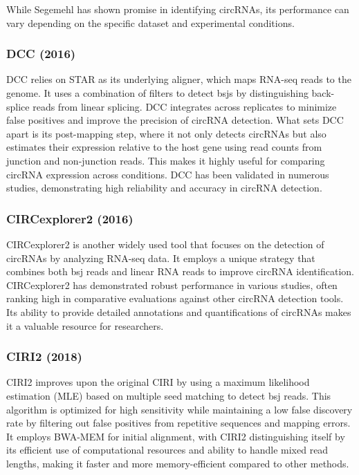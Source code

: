 While Segemehl has shown promise in identifying circRNAs, its performance can
vary depending on the specific dataset and experimental
conditions\supercite{gao_ciri_2015,zeng_comprehensive_2017}.

\subsubsection{DCC (2016)\supercite{cheng_specific_2016}}
DCC relies on STAR as its underlying aligner, which maps RNA-seq reads to the
genome.
It uses a combination of filters to detect \gls{bsj}s by distinguishing
back-splice reads from linear splicing.
DCC integrates across replicates to minimize false positives and improve the
precision of circRNA detection.
What sets DCC apart is its post-mapping step, where it not only detects
circRNAs but also estimates their expression relative to the host gene using
read counts from junction and non-junction reads.
This makes it highly useful for comparing circRNA expression across
conditions\supercite{cheng_specific_2016}.
DCC has been validated in numerous studies, demonstrating high reliability and
accuracy in circRNA detection\supercite{paraboschi_interpreting_2018}.

\subsubsection{CIRCexplorer2 (2016)\supercite{zhang_diverse_2016}}
CIRCexplorer2 is another widely used tool that focuses on the detection of
circRNAs by analyzing RNA-seq data.
It employs a unique strategy that combines both \gls{bsj} reads and linear RNA
reads to improve circRNA identification.
CIRCexplorer2 has demonstrated robust performance in various studies, often
ranking high in comparative evaluations against other circRNA detection
tools\supercite{zeng_comprehensive_2017,nicolet_circular_2018}.
Its ability to provide detailed annotations and quantifications of circRNAs
makes it a valuable resource for researchers\supercite{hansen_comparison_2016}.

\subsubsection{CIRI2 (2018)\supercite{gao_circular_2018}}
CIRI2 improves upon the original CIRI\supercite{gao_ciri_2015} by using a
maximum likelihood estimation (MLE) based on multiple seed matching to detect
\gls{bsj} reads.
This algorithm is optimized for high sensitivity while maintaining a low false
discovery rate by filtering out false positives from repetitive sequences and
mapping errors.
It employs BWA-MEM for initial alignment, with CIRI2 distinguishing itself by
its efficient use of computational resources and ability to handle mixed read
lengths, making it faster and more memory-efficient compared to other
methods\supercite{gao_circular_2018}.
